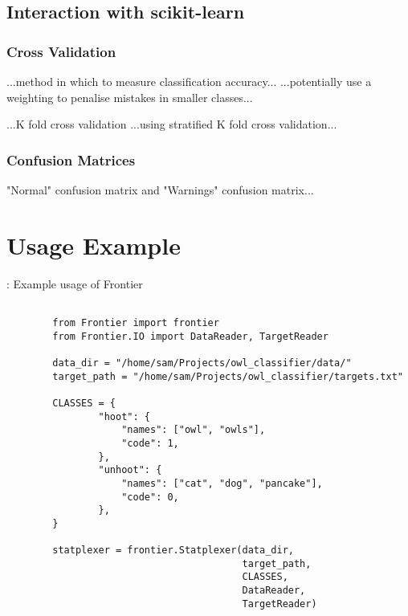\subsection{Interaction with scikit-learn}
\subsubsection{Cross Validation}

...method in which to measure classification accuracy...
...potentially use a weighting to penalise mistakes in smaller classes...

...K fold cross validation
...using stratified K fold cross validation...

\subsubsection{Confusion Matrices}
"Normal" confusion matrix and "Warnings" confusion matrix...

\section{Usage Example}

\begin{listing}[H]
    \caption[callstatplexer]{: Example usage of Frontier}
    \label{list:callstatplexer}
    \begin{verbatim}

        from Frontier import frontier
        from Frontier.IO import DataReader, TargetReader

        data_dir = "/home/sam/Projects/owl_classifier/data/"
        target_path = "/home/sam/Projects/owl_classifier/targets.txt"

        CLASSES = {
                "hoot": {
                    "names": ["owl", "owls"],
                    "code": 1,
                },
                "unhoot": {
                    "names": ["cat", "dog", "pancake"],
                    "code": 0,
                },
        }

        statplexer = frontier.Statplexer(data_dir,
                                         target_path,
                                         CLASSES,
                                         DataReader,
                                         TargetReader)
    \end{verbatim}
\end{listing}

